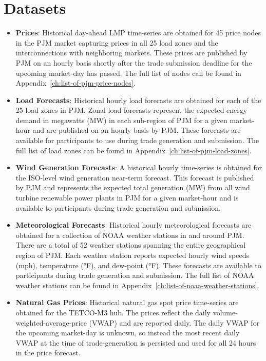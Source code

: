 \section{Datasets}\label{sec:datasets}

\begin{itemize}
    \item \textbf{Prices}: Historical day-ahead LMP time-series are obtained for 45 price nodes in the PJM market
    capturing prices in all 25 load zones and the interconnections with neighboring markets.
    These prices are published by PJM on an hourly basis shortly after the trade submission deadline for the upcoming
    market-day has passed.
    The full list of nodes can be found in Appendix~\ref{ch:list-of-pjm-price-nodes}.

    \item \textbf{Load Forecasts}: Historical hourly load forecasts are obtained for each of the 25 load zones in PJM\@.
    Zonal load forecasts represent the expected energy demand in megawatts (MW) in each sub-region of PJM for a given
    market-hour and are published on an hourly basis by PJM\@.
    These forecasts are available for participants to use during trade generation and submission.
    The full list of load zones can be found in Appendix~\ref{ch:list-of-pjm-load-zones}.

    \item \textbf{Wind Generation Forecasts}: A historical hourly time-series is obtained for the ISO-level wind generation
    near-term forecast.
    This forecast is published by PJM and represents the expected total generation (MW) from all wind turbine renewable
    power plants in PJM for a given market-hour and is available to participants during trade generation and submission.

    \item \textbf{Meteorological Forecasts}: Historical hourly meteorological forecasts are obtained for a collection
    of NOAA weather stations in and around PJM\@.
    There are a total of 52 weather stations spanning the entire geographical region of PJM\@.
    Each weather station reports expected hourly wind speeds (mph), temperature (°F), and dew-point (°F).
    These forecasts are available to participants during trade generation and submission.
    The full list of NOAA weather stations can be found in Appendix~\ref{ch:list-of-noaa-weather-stations}.

    \item \textbf{Natural Gas Prices}: Historical natural gas spot price time-series are obtained for the TETCO-M3 hub.
    The prices reflect the daily volume-weighted-average-price (VWAP) and are reported daily.
    The daily VWAP for the upcoming market-day is unknown, so instead the most recent daily VWAP at the time of
    trade-generation is persisted and used for all 24 hours in the price forecast.
\end{itemize}

